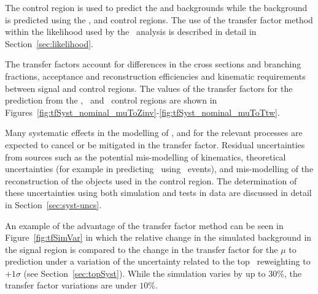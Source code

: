 The \mj control region is used to predict the \wj and \ttbar backgrounds while the
\znunu background is predicted using the \mj, \mmj and \gj control regions. The use of 
the transfer factor method within the likelihood used by the
\alphat~analysis is described in detail in Section~\ref{sec:likelihood}.
%

The transfer factors account for differences in the cross sections and branching fractions,
acceptance and reconstruction efficiencies and kinematic requirements between signal 
and control regions. The values of the transfer factors for the prediction from the \mj,
\mmj~and \gj~control regions are shown in Figures~\ref{fig:tfSyst_nominal_muToZinv}-\ref{fig:tfSyst_nominal_muToTtw}.

Many systematic effects in the modelling of \scalht, \nb and \njet for the relevant processes 
are expected to cancel or be mitigated in the transfer factor. Residual uncertainties from
sources such as the potential mis-modelling of kinematics, theoretical uncertainties (for example
in predicting \znunu~using \gj~events), and mis-modelling of the reconstruction of the objects
used in the control region. The determination of these uncertainties using both simulation 
and tests in data are discussed in detail in Section~\ref{sec:syst-uncs}.

An example of the advantage of the transfer factor method can be seen 
in Figure~\ref{fig:tfSimVar} in which the relative change in the simulated \ttW 
background in the signal region is compared to the change in the transfer factor for 
the $\mu$ to \ttW prediction under a variation of
the uncertainty related to the top \pt~reweighting to $+1\sigma$
(see Section~\ref{sec:topSyst}). While the simulation varies 
by up to 30\%, the transfer factor variations are under $10\%$.

